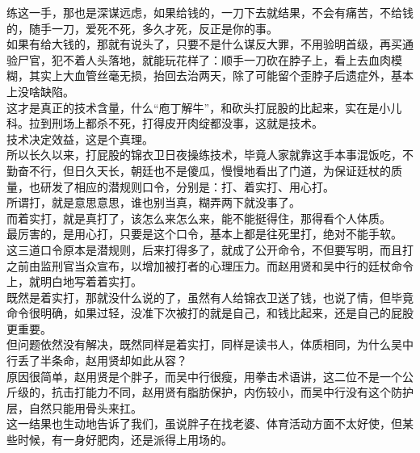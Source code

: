 \begin{multicols}{\theparacolNo}
练这一手，那也是深谋远虑，如果给钱的，一刀下去就结果，不会有痛苦，不给钱的，随手一刀，爱死不死，多久才死，反正是你的事。\\

如果有给大钱的，那就有说头了，只要不是什么谋反大罪，不用验明首级，再买通验尸官，犯不着人头落地，就能玩花样了：顺手一刀砍在脖子上，看上去血肉模糊，其实上大血管丝毫无损，抬回去治两天，除了可能留个歪脖子后遗症外，基本上没啥缺陷。\\

这才是真正的技术含量，什么“庖丁解牛”，和砍头打屁股的比起来，实在是小儿科。拉到刑场上都杀不死，打得皮开肉绽都没事，这就是技术。\\

技术决定效益，这是个真理。\\

所以长久以来，打屁股的锦衣卫日夜操练技术，毕竟人家就靠这手本事混饭吃，不勤奋不行，但日久天长，朝廷也不是傻瓜，慢慢地看出了门道，为保证廷杖的质量，也研发了相应的潜规则口令，分别是：打、着实打、用心打。\\

所谓打，就是意思意思，谁也别当真，糊弄两下就没事了。\\

而着实打，就是真打了，该怎么来怎么来，能不能挺得住，那得看个人体质。\\

最厉害的，是用心打，只要是这个口令，基本上都是往死里打，绝对不能手软。\\

这三道口令原本是潜规则，后来打得多了，就成了公开命令，不但要写明，而且打之前由监刑官当众宣布，以增加被打者的心理压力。而赵用贤和吴中行的廷杖命令上，就明白地写着着实打。\\

既然是着实打，那就没什么说的了，虽然有人给锦衣卫送了钱，也说了情，但毕竟命令很明确，如果过轻，没准下次被打的就是自己，和钱比起来，还是自己的屁股更重要。\\

但问题依然没有解决，既然同样是着实打，同样是读书人，体质相同，为什么吴中行丢了半条命，赵用贤却如此从容？\\

原因很简单，赵用贤是个胖子，而吴中行很瘦，用拳击术语讲，这二位不是一个公斤级的，抗击打能力不同，赵用贤有脂肪保护，内伤较小，而吴中行没有这个防护层，自然只能用骨头来扛。\\

这一结果也生动地告诉了我们，虽说胖子在找老婆、体育活动方面不太好使，但某些时候，有一身好肥肉，还是派得上用场的。\\


\end{multicols}
